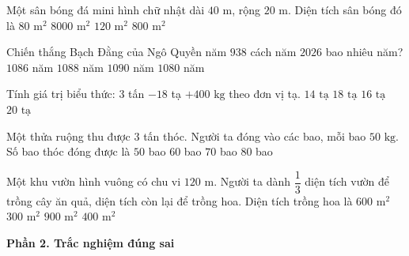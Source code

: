 \begin{ex} %
Một sân bóng đá mini hình chữ nhật dài $40\text{ m}$, rộng $20\text{ m}$. Diện tích sân bóng đó là
\choice
{$80\text{ m}^2$}
{$8000\text{ m}^2$}
{$120\text{ m}^2$}
{\True $800\text{ m}^2$}
\end{ex}

\begin{ex} %
Chiến thắng Bạch Đằng của Ngô Quyền năm $938$ cách năm $2026$ bao nhiêu năm?
\choice
{$1086$ năm}
{\True $1088$ năm}
{$1090$ năm}
{$1080$ năm}
\end{ex}

\begin{ex} %
Tính giá trị biểu thức: $3$ tấn $- 18$ tạ $+ 400\text{ kg}$ theo đơn vị tạ.
\choice
{$14\text{ tạ}$}
{$18\text{ tạ}$}
{\True $16\text{ tạ}$}
{$20\text{ tạ}$}
\end{ex}

\begin{ex} %
Một thửa ruộng thu được $3$ tấn thóc. Người ta đóng vào các bao, mỗi bao $50\text{ kg}$. Số bao thóc đóng được là
\choice
{$50$ bao}
{\True $60$ bao}
{$70$ bao}
{$80$ bao}
\end{ex}

\begin{ex} %
Một khu vườn hình vuông có chu vi $120\text{ m}$. Người ta dành $\dfrac{1}{3}$ diện tích vườn để trồng cây ăn quả, diện tích còn lại để trồng hoa. Diện tích trồng hoa là
\choice
{\True $600\text{ m}^2$}
{$300\text{ m}^2$}
{$900\text{ m}^2$}
{$400\text{ m}^2$}
\end{ex}

\textbf{Phần 2. Trắc nghiệm đúng sai}


